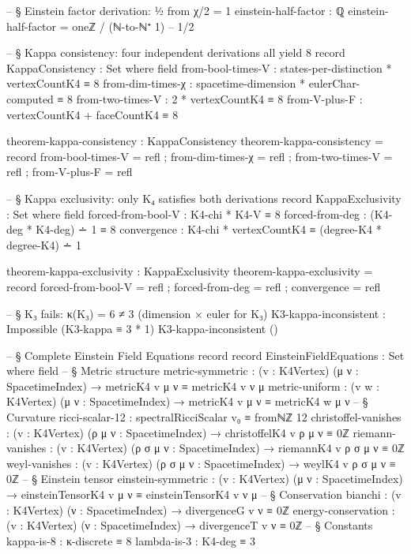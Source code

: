 \documentclass[11pt,a4paper]{book}
\begin{document}
\begin{code}
-- § Einstein factor derivation: ½ from χ/2 = 1
einstein-half-factor : ℚ
einstein-half-factor = oneℤ / (ℕ-to-ℕ⁺ 1)  -- 1/2

-- § Kappa consistency: four independent derivations all yield 8
record KappaConsistency : Set where
  field
    from-bool-times-V  : states-per-distinction * vertexCountK4 ≡ 8
    from-dim-times-χ   : spacetime-dimension * eulerChar-computed ≡ 8
    from-two-times-V   : 2 * vertexCountK4 ≡ 8
    from-V-plus-F      : vertexCountK4 + faceCountK4 ≡ 8

theorem-kappa-consistency : KappaConsistency
theorem-kappa-consistency = record
  { from-bool-times-V = refl
  ; from-dim-times-χ  = refl
  ; from-two-times-V  = refl
  ; from-V-plus-F     = refl }

-- § Kappa exclusivity: only K₄ satisfies both derivations
record KappaExclusivity : Set where
  field
    forced-from-bool-V : K4-chi * K4-V ≡ 8
    forced-from-deg    : (K4-deg * K4-deg) ∸ 1 ≡ 8
    convergence        : K4-chi * vertexCountK4 ≡ (degree-K4 * degree-K4) ∸ 1

theorem-kappa-exclusivity : KappaExclusivity
theorem-kappa-exclusivity = record
  { forced-from-bool-V = refl
  ; forced-from-deg    = refl
  ; convergence        = refl }

-- § K₃ fails: κ(K₃) = 6 ≠ 3 (dimension × euler for K₃)
K3-kappa-inconsistent : Impossible (K3-kappa ≡ 3 * 1)
K3-kappa-inconsistent ()

-- § Complete Einstein Field Equations record
record EinsteinFieldEquations : Set where
  field
    -- § Metric structure
    metric-symmetric : (v : K4Vertex) (μ ν : SpacetimeIndex) →
                       metricK4 v μ ν ≡ metricK4 v ν μ
    metric-uniform : (v w : K4Vertex) (μ ν : SpacetimeIndex) →
                     metricK4 v μ ν ≡ metricK4 w μ ν
    -- § Curvature
    ricci-scalar-12 : spectralRicciScalar v₀ ≡ fromℕℤ 12
    christoffel-vanishes : (v : K4Vertex) (ρ μ ν : SpacetimeIndex) →
                           christoffelK4 v ρ μ ν ≡ 0ℤ
    riemann-vanishes : (v : K4Vertex) (ρ σ μ ν : SpacetimeIndex) →
                       riemannK4 v ρ σ μ ν ≡ 0ℤ
    weyl-vanishes : (v : K4Vertex) (ρ σ μ ν : SpacetimeIndex) →
                    weylK4 v ρ σ μ ν ≡ 0ℤ
    -- § Einstein tensor
    einstein-symmetric : (v : K4Vertex) (μ ν : SpacetimeIndex) →
                         einsteinTensorK4 v μ ν ≡ einsteinTensorK4 v ν μ
    -- § Conservation
    bianchi : (v : K4Vertex) (ν : SpacetimeIndex) → divergenceG v ν ≡ 0ℤ
    energy-conservation : (v : K4Vertex) (ν : SpacetimeIndex) → divergenceT v ν ≡ 0ℤ
    -- § Constants
    kappa-is-8 : κ-discrete ≡ 8
    lambda-is-3 : K4-deg ≡ 3


\end{code}
\end{document}
